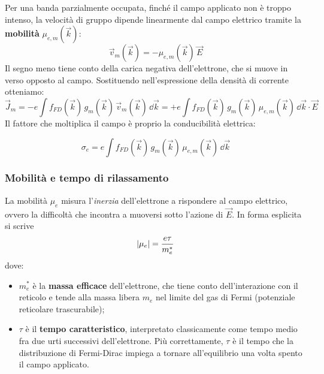 Per una banda parzialmente occupata, finché il campo applicato non è troppo intenso, la velocità di gruppo dipende linearmente dal campo elettrico tramite la \textbf{mobilità} \( \mu_{e,m}(\vec{k}) \):
\begin{equation}
    \vec{v}_m(\vec{k}) = -\mu_{e,m}(\vec{k}) \, \vec{E}
\end{equation}
Il segno meno tiene conto della carica negativa dell'elettrone, che si muove in verso opposto al campo. Sostituendo nell'espressione della densità di corrente otteniamo:
\begin{equation}
    \vec{J}_m = -e \int f_{FD}(\vec{k}) \, g_m(\vec{k}) \, \vec{v}_m(\vec{k}) \, \dd \vec{k} = +e \int f_{FD}(\vec{k}) \, g_m(\vec{k}) \, \mu_{e,m}(\vec{k}) \, \dd \vec{k} \cdot \vec{E}
\end{equation}
Il fattore che moltiplica il campo è proprio la conducibilità elettrica:
\begin{importantbox}
    \begin{equation}
        \sigma_e = e \int f_{FD}(\vec{k}) \, g_m(\vec{k}) \, \mu_{e,m}(\vec{k}) \, \dd \vec{k}
    \end{equation}
\end{importantbox}

\subsubsection{Mobilità e tempo di rilassamento}

La mobilità \( \mu_e \) misura l'\emph{inerzia} dell'elettrone a rispondere al campo elettrico, ovvero la difficoltà che incontra a muoversi sotto l'azione di \( \vec{E} \). In forma esplicita si scrive
\begin{equation}
    \abs{\mu_e} = \frac{e \tau}{m_e^*}
\end{equation}
dove:
\begin{itemize}
    \item \( m_e^* \) è la \textbf{massa efficace} dell'elettrone, che tiene conto dell'interazione con il reticolo e tende alla massa libera \( m_e \) nel limite del gas di Fermi (potenziale reticolare trascurabile);
    \item \( \tau \) è il \textbf{tempo caratteristico}, interpretato classicamente come tempo medio fra due urti successivi dell'elettrone. Più correttamente, \( \tau \) è il tempo che la distribuzione di Fermi-Dirac impiega a tornare all'equilibrio una volta spento il campo applicato.
\end{itemize}

